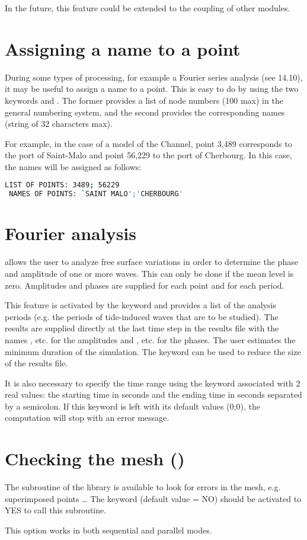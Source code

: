 In the future, this feature could be extended to the coupling of other modules.


\section{Assigning a name to a point}

During some types of processing, for example a Fourier series analysis
(see 14.10),
it may be useful to assign a name to a point.
This is easy to do by using the two keywords 
and .
The former provides a list of node numbers (100 max) in the general numbering
system,
and the second provides the corresponding names (string of 32 characters max).

For example, in the case of a model of the Channel, point 3,489 corresponds
to the port of Saint-Malo and point 56,229 to the port of Cherbourg.
In this case, the names will be assigned as follows:
\begin{lstlisting}[language=bash]
 LIST OF POINTS: 3489; 56229
 NAMES OF POINTS: `SAINT MALO';'CHERBOURG'
\end{lstlisting}

\section{Fourier analysis}

 allows the user to analyze free surface variations
in order to determine the phase and amplitude of one or more waves.
This can only be done if the mean level is zero.
Amplitudes and phases are supplied for each point and for each period.

This feature is activated by the keyword  and
provides a list of the analysis periods (e.g. the periods of tide-induced waves
that are to be studied).
The results are supplied directly at the last time step in the results file with
the names ,  etc. for the amplitudes
and ,  etc. for the phases.
The user estimates the minimum duration of the simulation.
The keyword 
can be used to reduce the size of the results file.

It is also necessary to specify the time range using the keyword
 associated with 2 real values:
the starting time in seconds and the ending time in seconds separated by a
semicolon.
If this keyword is left with its default values (0;0),
the computation will stop with an error message.

\section{Checking the mesh ()}

The  subroutine of the \bief library is available to look for
errors in the mesh, e.g. superimposed points \ldots
The keyword  (default value = NO) should be activated
to YES to call this subroutine.

This option works in both sequential and parallel modes.

